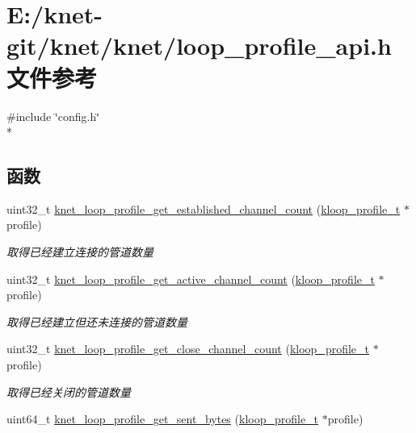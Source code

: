 \hypertarget{a00087}{}\section{E\+:/knet-\/git/knet/knet/loop\+\_\+profile\+\_\+api.h 文件参考}
\label{a00087}
{\ttfamily \#include \char`\"{}config.\+h\char`\"{}}\\*
\subsection*{函数}
\begin{DoxyCompactItemize}
\item 
uint32\+\_\+t \hyperlink{a00087_a30be8a49214eb1485429bdff63541dfc_a30be8a49214eb1485429bdff63541dfc}{knet\+\_\+loop\+\_\+profile\+\_\+get\+\_\+established\+\_\+channel\+\_\+count} (\hyperlink{a00056_ab75a5c23099a6118c469ed160b277f28_ab75a5c23099a6118c469ed160b277f28}{kloop\+\_\+profile\+\_\+t} $\ast$profile)
\begin{DoxyCompactList}\small\item\em 取得已经建立连接的管道数量 \end{DoxyCompactList}\item 
uint32\+\_\+t \hyperlink{a00087_a9b4aceae0c7a1f1aa86c8db5996ec76a_a9b4aceae0c7a1f1aa86c8db5996ec76a}{knet\+\_\+loop\+\_\+profile\+\_\+get\+\_\+active\+\_\+channel\+\_\+count} (\hyperlink{a00056_ab75a5c23099a6118c469ed160b277f28_ab75a5c23099a6118c469ed160b277f28}{kloop\+\_\+profile\+\_\+t} $\ast$profile)
\begin{DoxyCompactList}\small\item\em 取得已经建立但还未连接的管道数量 \end{DoxyCompactList}\item 
uint32\+\_\+t \hyperlink{a00087_a6eaacce21d69455a4e70bd6da4927082_a6eaacce21d69455a4e70bd6da4927082}{knet\+\_\+loop\+\_\+profile\+\_\+get\+\_\+close\+\_\+channel\+\_\+count} (\hyperlink{a00056_ab75a5c23099a6118c469ed160b277f28_ab75a5c23099a6118c469ed160b277f28}{kloop\+\_\+profile\+\_\+t} $\ast$profile)
\begin{DoxyCompactList}\small\item\em 取得已经关闭的管道数量 \end{DoxyCompactList}\item 
uint64\+\_\+t \hyperlink{a00087_a5bb651c97109287f36481c70c4096d02_a5bb651c97109287f36481c70c4096d02}{knet\+\_\+loop\+\_\+profile\+\_\+get\+\_\+sent\+\_\+bytes} (\hyperlink{a00056_ab75a5c23099a6118c469ed160b277f28_ab75a5c23099a6118c469ed160b277f28}{kloop\+\_\+profile\+\_\+t} $\ast$profile)

\end{DoxyCompactItemize}
